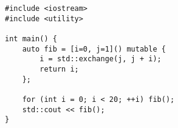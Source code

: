 \begin{lstlisting}[title=\href{https://godbolt.org/z/_MkUDw}{\texttt{godbolt.org/z/\_MkUDw}}]
#include <iostream>
#include <utility>

int main() {
    auto fib = [i=0, j=1]() mutable {
        i = std::exchange(j, j + i);
        return i;
    };

    for (int i = 0; i < 20; ++i) fib();
    std::cout << fib();
}
\end{lstlisting}
